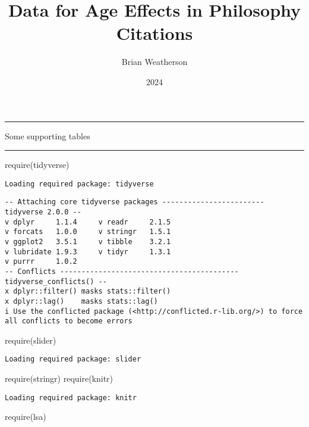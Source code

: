 \documentclass[
  10pt,
  letterpaper,
  DIV=11,
  numbers=noendperiod,
  twoside]{scrartcl}
\title{Data for Age Effects in Philosophy Citations}
\author{Brian Weatherson}
\date{2024}
\newenvironment{Shaded}{\begin{snugshade}}{\end{snugshade}}
\newcommand{\FunctionTok}[1]{\textcolor[rgb]{0.28,0.35,0.67}{#1}}
\newcommand{\NormalTok}[1]{\textcolor[rgb]{0.00,0.23,0.31}{#1}}
\renewenvironment{abstract}
 {\vspace{-1.25cm}
 \quotation\small\noindent\rule{\linewidth}{.5pt}\par\smallskip
 \noindent }
 {\par\noindent\rule{\linewidth}{.5pt}\endquotation}
\begin{document}
\maketitle
\begin{abstract}
Some supporting tables
\end{abstract}


\begin{Shaded}
\begin{Highlighting}[]
\FunctionTok{require}\NormalTok{(tidyverse)}
\end{Highlighting}
\end{Shaded}

\begin{verbatim}
Loading required package: tidyverse
\end{verbatim}

\begin{verbatim}
-- Attaching core tidyverse packages ------------------------ tidyverse 2.0.0 --
v dplyr     1.1.4     v readr     2.1.5
v forcats   1.0.0     v stringr   1.5.1
v ggplot2   3.5.1     v tibble    3.2.1
v lubridate 1.9.3     v tidyr     1.3.1
v purrr     1.0.2     
-- Conflicts ------------------------------------------ tidyverse_conflicts() --
x dplyr::filter() masks stats::filter()
x dplyr::lag()    masks stats::lag()
i Use the conflicted package (<http://conflicted.r-lib.org/>) to force all conflicts to become errors
\end{verbatim}

\begin{Shaded}
\begin{Highlighting}[]
\FunctionTok{require}\NormalTok{(slider)}
\end{Highlighting}
\end{Shaded}

\begin{verbatim}
Loading required package: slider
\end{verbatim}

\begin{Shaded}
\begin{Highlighting}[]
\FunctionTok{require}\NormalTok{(stringr)}
\FunctionTok{require}\NormalTok{(knitr)}
\end{Highlighting}
\end{Shaded}

\begin{verbatim}
Loading required package: knitr
\end{verbatim}

\begin{Shaded}
\begin{Highlighting}[]
\FunctionTok{require}\NormalTok{(lsa)}
\end{Highlighting}
\end{Shaded}
\end{document}
